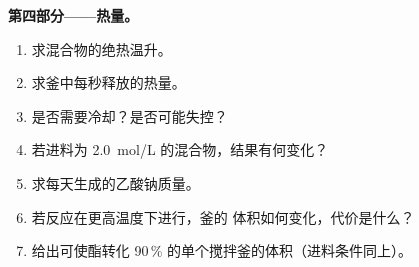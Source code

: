 \begin{problem}
\medskip
\noindent\textbf{第四部分——热量。}
\begin{enumerate}[resume]
  \item 求混合物的绝热温升。
  \item 求釜中每秒释放的热量。
  \item 是否需要冷却？是否可能失控？
  \item 若进料为 \qty{2.0}{mol/L} 的混合物，结果有何变化？
  \item 求每天生成的乙酸钠质量。
  \item 若反应在更高温度下进行，釜的
        体积如何变化，代价是什么？
  \item 给出可使酯转化 90\,\%
        的单个搅拌釜的体积（进料条件同上）。
\end{enumerate}
\end{problem}
